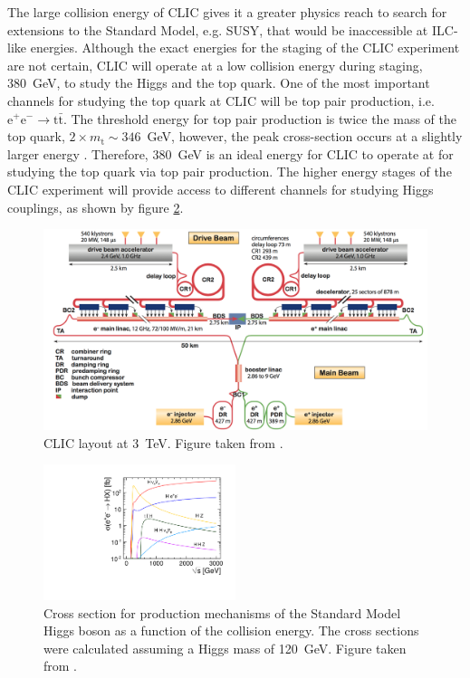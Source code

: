 The large collision energy of CLIC gives it a greater physics reach to search for extensions to the Standard Model, e.g. SUSY, that would be inaccessible at ILC-like energies.  Although the exact energies for the staging of the CLIC experiment are not certain, CLIC will operate at a low collision energy during staging, 380~GeV, to study the Higgs {and the top quark.  One of the most important channels for studying the top quark at CLIC will be top pair production, i.e. $\text{e}^{+}\text{e}^{-} \rightarrow \text{t}\bar{\text{t}}$.  The threshold energy for top pair production is twice the mass of the top quark, $2 \times m_{\text{t}} \sim 346$~GeV, however, the peak cross-section occurs at a slightly larger energy \cite{Linssen:2012hp}.  Therefore, 380~GeV is an ideal energy for CLIC to operate at for studying the top quark via top pair production.}  The higher energy stages of the CLIC experiment will provide access to different channels for studying Higgs couplings, as shown by figure \ref{fig:higssprodclic}.

\begin{figure}[h!]
\includegraphics[width=1.0\textwidth]{Introduction/Plots/CLIC.png}
\caption[CLIC layout at 3~TeV.  {Figure taken from} \cite{CLIC:2016zwp}.]{CLIC layout at 3~TeV.  {Figure taken from} \cite{CLIC:2016zwp}.}
\label{fig:clic}
\end{figure}

\begin{figure}[h!]
\includegraphics[width=0.5\textwidth]{Introduction/Plots/CDRPlots/HiggsCrossSectionCLIC.pdf}
\caption[Cross section for production mechanisms of the Standard Model Higgs boson as a function of the collision energy.  The cross sections were calculated assuming a Higgs mass of 120~GeV.  Figure taken from \cite{Linssen:2012hp}.]{Cross section for production mechanisms of the Standard Model Higgs boson as a function of the collision energy.  The cross sections were calculated assuming a Higgs mass of 120~GeV.  Figure taken from \cite{Linssen:2012hp}.}
\label{fig:higssprodclic}
\end{figure}

